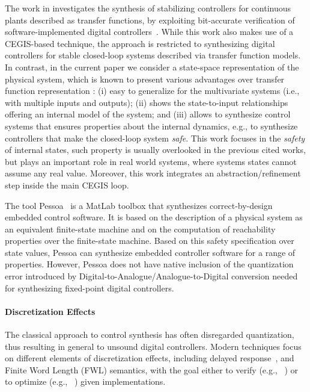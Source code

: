 \documentclass[runningheads,a4paper]{llncs}
\begin{document}
The work in \cite{DBLP:journals/corr/AbateBCCDKK16} investigates the
synthesis of stabilizing controllers for continuous plants described as
transfer functions, by exploiting bit-accurate verification of
software-implemented digital controllers~\cite{Bessa16}.  While this work
also makes use of a CEGIS-based technique, the approach is restricted to
synthesizing digital controllers for stable closed-loop systems described
via transfer function models.  In contrast, in the current paper we consider
a state-space representation of the physical system, which is known to present
various advantages over transfer function representation \cite{Astrom08}: (i) 
easy to generalize for the multivariate systems (i.e., with multiple inputs 
and outputs); (ii) shows the state-to-input relationships offering an internal 
model of the system; and (iii) allows to synthesize control systems that ensures
properties about the internal dynamics, e.g., to synthesize controllers that make
the closed-loop system \emph{safe}. This work focuses in the \emph{safety} of 
internal states, such property is usually overlooked in the previous cited 
works, but plays an important role in real world systems, where systems states 
cannot assume any real value. Moreover, this work integrates an
abstraction/refinement step inside the main CEGIS loop.

The tool Pessoa~\cite{mazo2010pessoa} is a MatLab toolbox that synthesizes
correct-by-design embedded control software.  It is based on the description
of a physical system as an equivalent finite-state machine and on the
computation of reachability properties over the finite-state machine.  Based
on this safety specification over state values, Pessoa can synthesize
embedded controller software for a range of properties.
However, Pessoa does not have native inclusion of the quantization error
introduced by Digital-to-Analogue/Analogue-to-Digital conversion needed for
synthesizing fixed-point digital controllers.


\paragraph{Discretization Effects}

The classical approach to control synthesis has often disregarded
quantization, thus resulting in general to unsound digital controllers. 
Modern techniques focus on different elements of discretization effects,
including delayed response~\cite{Duggirala2015}, and Finite Word Length
(FWL) semantics, with the goal either to verify (e.g.,~ \cite{daes20161}) or
to optimize (e.g.,~ \cite{oudjida2014design}) given implementations.
\end{document}
